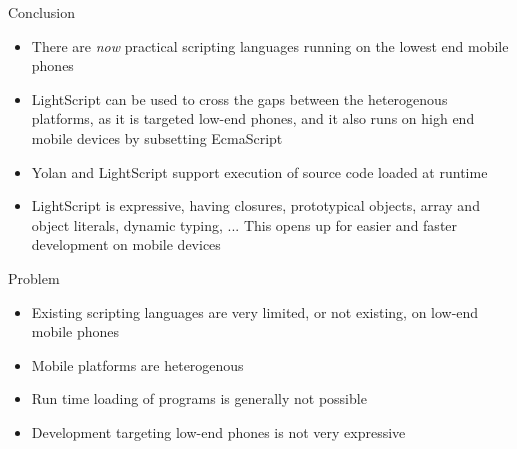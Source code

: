 \documentclass[a4paper,landscape]{slides}
\begin{document}
\begin{slide}
	{\large 
            Conclusion
        }
	\begin{itemize} \setlength{\itemsep}{0mm}
            \item There are \emph{now} practical scripting languages running on the lowest end mobile phones
	\end{itemize}
	\begin{itemize} \setlength{\itemsep}{-2mm}
            \item LightScript can be used to cross the gaps between the heterogenous platforms, as it is targeted low-end phones, and it also runs on high end mobile devices by subsetting EcmaScript
            \item Yolan and LightScript support execution of source code loaded at runtime
            \item LightScript is expressive, having closures, prototypical objects, array and object literals, dynamic typing, ... This opens up for easier and faster development on mobile devices
	\end{itemize}
\end{slide}

\begin{slide}
	{\large 
            Problem
	\\ \mbox{}}
	\begin{itemize} \setlength{\itemsep}{10mm}
            \item Existing scripting languages are very limited, or not existing, on low-end mobile phones
	\end{itemize}
	\begin{itemize} \setlength{\itemsep}{3mm}
            \item Mobile platforms are heterogenous
            \item Run time loading of programs is generally not possible
            \item Development targeting low-end phones is not very expressive
	\end{itemize}
\end{slide}
\end{document}
